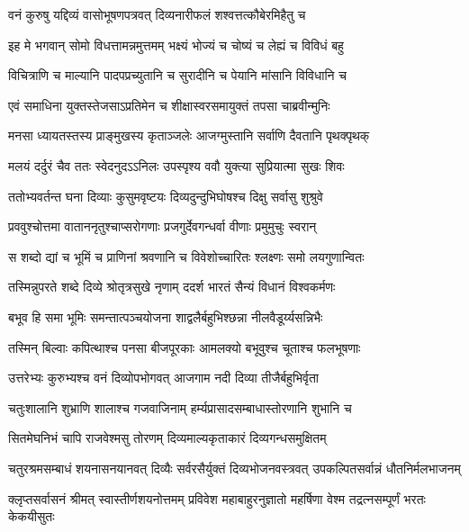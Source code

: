 \twolineshloka
{वनं कुरुषु यद्दिव्यं वासोभूषणपत्रवत्}
{दिव्यनारीफलं शश्वत्तत्कौबेरमिहैतु च} %

\twolineshloka
{इह मे भगवान् सोमो विधत्तामन्नमुत्तमम्}
{भक्ष्यं भोज्यं च चोष्यं च लेह्यं च विविधं बहु} %

\twolineshloka
{विचित्राणि च माल्यानि पादपप्रच्युतानि च}
{सुरादीनि च पेयानि मांसानि विविधानि च} %

\twolineshloka
{एवं समाधिना युक्तस्तेजसाऽप्रतिमेन च}
{शीक्षास्वरसमायुक्तं तपसा चाब्रवीन्मुनिः} %

\twolineshloka
{मनसा ध्यायतस्तस्य प्राङ्मुखस्य कृताञ्जलेः}
{आजग्मुस्तानि सर्वाणि दैवतानि पृथक्पृथक्} %

\twolineshloka
{मलयं दर्दुरं चैव ततः स्वेदनुदऽऽनिलः}
{उपस्पृश्य ववौ युक्त्या सुप्रियात्मा सुखः शिवः} %

\twolineshloka
{ततोभ्यवर्तन्त घना दिव्याः कुसुमवृष्टयः}
{दिव्यदुन्दुभिघोषश्च दिक्षु सर्वासु शुश्रुवे} %

\twolineshloka
{प्रववुश्चोत्तमा वाताननृतुश्चाप्सरोगणाः}
{प्रजगुर्देवगन्धर्वा वीणाः प्रमुमुचुः स्वरान्} %

\twolineshloka
{स शब्दो द्यां च भूमिं च प्राणिनां श्रवणानि च}
{विवेशोच्चारितः श्लक्ष्णः समो लयगुणान्वितः} %

\twolineshloka
{तस्मिन्नुपरते शब्दे दिव्ये श्रोतृत्रसुखे नृणाम्}
{ददर्श भारतं सैन्यं विधानं विश्वकर्मणः} %

\twolineshloka
{बभूव हि समा भूमिः समन्तात्पञ्चयोजना}
{शाद्वलैर्बहुभिश्छन्ना नीलवैडूर्य्यसन्निभैः} %

\twolineshloka
{तस्मिन् बिल्वाः कपित्थाश्च पनसा बीजपूरकाः}
{आमलक्यो बभूवुश्च चूताश्च फलभूषणाः} %

\twolineshloka
{उत्तरेभ्यः कुरुभ्यश्च वनं दिव्योपभोगवत्}
{आजगाम नदी दिव्या तीजैर्बहुभिर्वृता} %

\twolineshloka
{चतुःशालानि शुभ्राणि शालाश्च गजवाजिनाम्}
{हर्म्यप्रासादसम्बाधास्तोरणानि शुभानि च} %

\twolineshloka
{सितमेघनिभं चापि राजवेश्मसु तोरणम्}
{दिव्यमाल्यकृताकारं दिव्यगन्धसमुक्षितम्} %

\threelineshloka
{चतुरश्रमसम्बाधं शयनासनयानवत्}
{दिव्यैः सर्वरसैर्युक्तं दिव्यभोजनवस्त्रवत्}
{उपकल्पितसर्वान्नं धौतनिर्मलभाजनम्} %

\threelineshloka
{क्लृप्तसर्वासनं श्रीमत् स्वास्तीर्णशयनोत्तमम्}
{प्रविवेश महाबाहुरनुज्ञातो महर्षिणा}
{वेश्म तद्रत्नसम्पूर्णं भरतः केकयीसुतः} %

